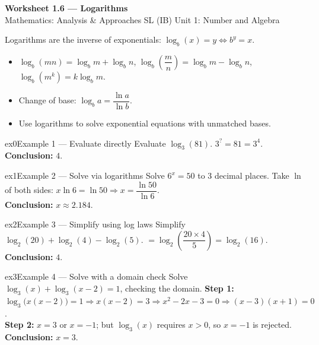 \documentclass[11pt]{article}
\begin{document}
\begin{center}
{\LARGE\bfseries\color{titleblue}Worksheet 1.6 --- Logarithms}\\[2pt]
{\small Mathematics: Analysis \& Approaches SL (IB) \textperiodcentered{} Unit 1: Number and Algebra}
\end{center}

\begin{ideabox}
Logarithms are the inverse of exponentials: $\log_b(x)=y\iff b^y=x$.
\begin{itemize}[leftmargin=*,itemsep=2pt]
  \item $\log_b(mn)=\log_bm+\log_bn$, $\log_b\!\left(\dfrac mn\right)=\log_bm-\log_bn$, $\log_b(m^k)=k\log_bm$.
  \item Change of base: $\log_ba=\dfrac{\ln a}{\ln b}$.
  \item Use logarithms to solve exponential equations with unmatched bases.
\end{itemize}
\end{ideabox}


\begin{example}{ex0}{Example 1 --- Evaluate directly}
Evaluate $\log_3(81)$.\soln
$3^{?}=81=3^4$.\\[3pt]\textbf{Conclusion:} $4$.
\end{example}

\begin{example}{ex1}{Example 2 --- Solve via logarithms}
Solve $6^x=50$ to 3 decimal places.\soln
Take $\ln$ of both sides: $x\ln6=\ln50\Rightarrow x=\dfrac{\ln50}{\ln6}$.\\[3pt]\textbf{Conclusion:} $x\approx2.184$.
\end{example}

\begin{example}{ex2}{Example 3 --- Simplify using log laws}
Simplify $\log_2(20)+\log_2(4)-\log_2(5)$.\soln
$=\log_2\!\left(\dfrac{20\times4}{5}\right)=\log_2(16)$.\\[3pt]\textbf{Conclusion:} $4$.
\end{example}

\begin{example}{ex3}{Example 4 --- Solve with a domain check}
Solve $\log_3(x)+\log_3(x-2)=1$, checking the domain.\soln
\textbf{Step 1:} $\log_3\big(x(x-2)\big)=1\Rightarrow x(x-2)=3\Rightarrow x^2-2x-3=0\Rightarrow(x-3)(x+1)=0$.\\[3pt]
\textbf{Step 2:} $x=3$ or $x=-1$; but $\log_3(x)$ requires $x>0$, so $x=-1$ is rejected.\\[3pt]
\textbf{Conclusion:} $x=3$.
\end{example}
\end{document}
